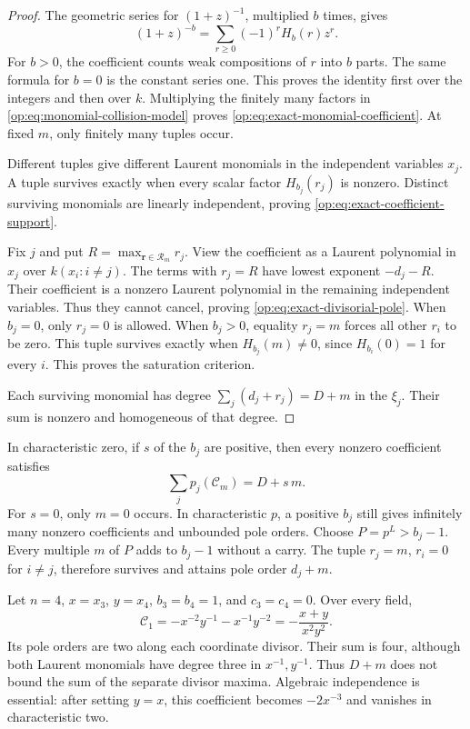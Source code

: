 \begin{proof}
The geometric series for \((1+z)^{-1}\), multiplied \(b\)
times, gives
\[
 (1+z)^{-b}=\sum_{r\ge0}(-1)^rH_b(r)z^r.
\]
For \(b>0\), the coefficient counts weak compositions of
\(r\) into \(b\) parts.  The same formula for \(b=0\)
is the constant series one.  This proves the identity first over
the integers and then over \(k\).  Multiplying the finitely many
factors in \eqref{op:eq:monomial-collision-model} proves
\eqref{op:eq:exact-monomial-coefficient}.  At fixed \(m\), only
finitely many tuples occur.

Different tuples give different Laurent monomials in the independent
variables \(x_j\).  A tuple survives exactly when every scalar
factor \(H_{b_j}(r_j)\) is nonzero.  Distinct surviving
monomials are linearly independent, proving
\eqref{op:eq:exact-coefficient-support}.

Fix \(j\) and put \(R=\max_{\mathbf r\in\mathcal R_m}r_j\).
View the coefficient as a Laurent polynomial in \(x_j\) over
\(k(x_i:i\ne j)\).  The terms with \(r_j=R\) have lowest
exponent \(-d_j-R\).  Their coefficient is a nonzero Laurent
polynomial in the remaining independent variables.  Thus they
cannot cancel, proving \eqref{op:eq:exact-divisorial-pole}.
When \(b_j=0\), only \(r_j=0\) is allowed.
When \(b_j>0\), equality \(r_j=m\) forces all other
\(r_i\) to be zero.  This tuple survives exactly when
\(H_{b_j}(m)\ne0\), since \(H_{b_i}(0)=1\) for every
\(i\).  This proves the saturation criterion.

Each surviving monomial has degree
\(\sum_j(d_j+r_j)=D+m\) in the \(\xi_j\).
Their sum is nonzero and homogeneous of that degree.
\end{proof}

In characteristic zero, if \(s\) of the \(b_j\) are positive,
then every nonzero coefficient satisfies
\begin{equation}\label{op:eq:sum-divisor-maxima}
 \sum_jp_j(\mathcal C_m)=D+s\,m.
\end{equation}
For \(s=0\), only \(m=0\) occurs.
In characteristic \(p\), a positive \(b_j\) still gives
infinitely many nonzero coefficients and unbounded pole orders.
Choose \(P=p^L>b_j-1\).  Every multiple \(m\) of \(P\)
adds to \(b_j-1\) without a carry.  The tuple \(r_j=m\),
\(r_i=0\) for \(i\ne j\), therefore survives and attains
pole order \(d_j+m\).

\begin{example}
\label{op:ex:four-point-degree-counts}
Let \(n=4\), \(x=x_3\), \(y=x_4\),
\(b_3=b_4=1\), and \(c_3=c_4=0\).  Over every field,
\[
 \mathcal C_1=-x^{-2}y^{-1}-x^{-1}y^{-2}
             =-\frac{x+y}{x^2y^2}.
\]
Its pole orders are two along each coordinate divisor.
Their sum is four, although both Laurent monomials have degree
three in \(x^{-1},y^{-1}\).  Thus \(D+m\) does not bound
the sum of the separate divisor maxima.
Algebraic independence is essential: after setting \(y=x\),
this coefficient becomes \(-2x^{-3}\) and vanishes in
characteristic two.
\end{example}

